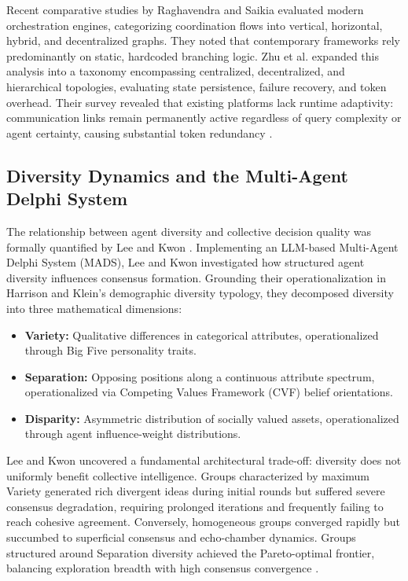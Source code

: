 \documentclass[conference]{IEEEtran}
\begin{document}
Recent comparative studies by Raghavendra and Saikia \cite{raghavendra2026} evaluated modern orchestration engines, categorizing coordination flows into vertical, horizontal, hybrid, and decentralized graphs. They noted that contemporary frameworks rely predominantly on static, hardcoded branching logic. Zhu et al. \cite{zhu2026} expanded this analysis into a taxonomy encompassing centralized, decentralized, and hierarchical topologies, evaluating state persistence, failure recovery, and token overhead. Their survey revealed that existing platforms lack runtime adaptivity: communication links remain permanently active regardless of query complexity or agent certainty, causing substantial token redundancy \cite{zhu2026, yu2026}.

\subsection{Diversity Dynamics and the Multi-Agent Delphi System}
The relationship between agent diversity and collective decision quality was formally quantified by Lee and Kwon \cite{lee2026}. Implementing an LLM-based Multi-Agent Delphi System (MADS), Lee and Kwon investigated how structured agent diversity influences consensus formation. Grounding their operationalization in Harrison and Klein's demographic diversity typology, they decomposed diversity into three mathematical dimensions:
\begin{itemize}
    \item \textbf{Variety:} Qualitative differences in categorical attributes, operationalized through Big Five personality traits.
    \item \textbf{Separation:} Opposing positions along a continuous attribute spectrum, operationalized via Competing Values Framework (CVF) belief orientations.
    \item \textbf{Disparity:} Asymmetric distribution of socially valued assets, operationalized through agent influence-weight distributions.
\end{itemize}

Lee and Kwon \cite{lee2026} uncovered a fundamental architectural trade-off: diversity does not uniformly benefit collective intelligence. Groups characterized by maximum Variety generated rich divergent ideas during initial rounds but suffered severe consensus degradation, requiring prolonged iterations and frequently failing to reach cohesive agreement. Conversely, homogeneous groups converged rapidly but succumbed to superficial consensus and echo-chamber dynamics. Groups structured around Separation diversity achieved the Pareto-optimal frontier, balancing exploration breadth with high consensus convergence \cite{lee2026}.
\end{document}
